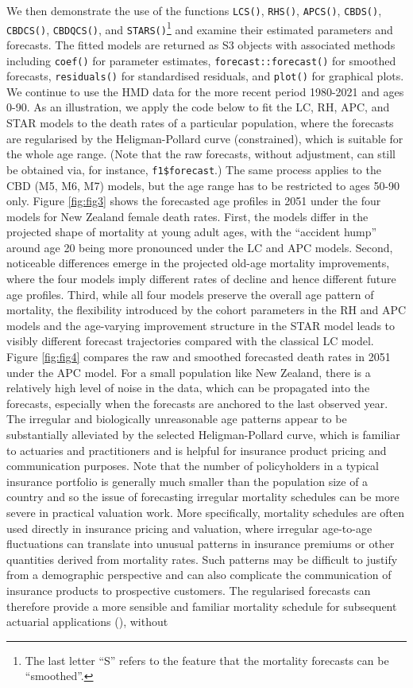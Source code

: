We then demonstrate the use of the functions \texttt{LCS()}, \texttt{RHS()}, \texttt{APCS()}, \texttt{CBDS()}, \texttt{CBDCS()}, \texttt{CBDQCS()}, and \texttt{STARS()}\footnote{The last letter ``S'' refers to the feature that the mortality forecasts can be ``smoothed''.} and examine their estimated parameters and forecasts. The fitted models are returned as S3 objects with associated methods including \texttt{coef()} for parameter estimates, \texttt{forecast::forecast()} for smoothed forecasts, \texttt{residuals()} for standardised residuals, and \texttt{plot()} for graphical plots. We continue to use the HMD data for the more recent period 1980-2021 and ages 0-90. As an illustration, we apply the code below to fit the LC, RH, APC, and STAR models to the death rates of a particular population, where the forecasts are regularised by the Heligman-Pollard curve (constrained), which is suitable for the whole age range. (Note that the raw forecasts, without adjustment, can still be obtained via, for instance, \texttt{f1\$forecast}.) The same process applies to the CBD (M5, M6, M7) models, but the age range has to be restricted to ages 50-90 only. Figure \ref{fig:fig3} shows the forecasted age profiles in 2051 under the four models for New Zealand female death rates. First, the models differ in the projected shape of mortality at young adult ages, with the ``accident hump'' around age 20 being more pronounced under the LC and APC models. Second, noticeable differences emerge in the projected old-age mortality improvements, where the four models imply different rates of decline and hence different future age profiles. Third, while all four models preserve the overall age pattern of mortality, the flexibility introduced by the cohort parameters in the RH and APC models and the age-varying improvement structure in the STAR model leads to visibly different forecast trajectories compared with the classical LC model. Figure \ref{fig:fig4} compares the raw and smoothed forecasted death rates in 2051 under the APC model. For a small population like New Zealand, there is a relatively high level of noise in the data, which can be propagated into the forecasts, especially when the forecasts are anchored to the last observed year. The irregular and biologically unreasonable age patterns appear to be substantially alleviated by the selected Heligman-Pollard curve, which is familiar to actuaries and practitioners and is helpful for insurance product pricing and communication purposes. Note that the number of policyholders in a typical insurance portfolio is generally much smaller than the population size of a country and so the issue of forecasting irregular mortality schedules can be more severe in practical valuation work. More specifically, mortality schedules are often used directly in insurance pricing and valuation, where irregular age-to-age fluctuations can translate into unusual patterns in insurance premiums or other quantities derived from mortality rates. Such patterns may be difficult to justify from a demographic perspective and can also complicate the communication of insurance products to prospective customers. The regularised forecasts can therefore provide a more sensible and familiar mortality schedule for subsequent actuarial applications (\citet{Atkinson2018}), without 